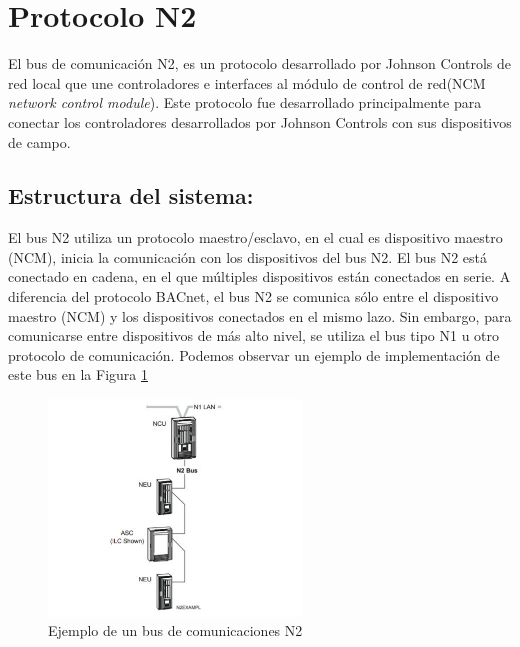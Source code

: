 \section{Protocolo N2}
El bus de comunicación N2, es un protocolo desarrollado por Johnson Controls de red local que une controladores e interfaces al módulo de control de red(NCM \textit{network control module}). Este protocolo fue desarrollado principalmente para conectar los controladores desarrollados por Johnson Controls con sus dispositivos de campo.

\subsection{Estructura del sistema:}
El bus N2 utiliza un protocolo maestro/esclavo, en el cual es dispositivo maestro (NCM), inicia la comunicación con los dispositivos del bus N2. El bus N2 está conectado en cadena, en el que múltiples dispositivos están conectados en serie. A diferencia del protocolo BACnet, el bus N2 se comunica sólo entre el dispositivo maestro (NCM) y los dispositivos conectados en el mismo lazo. Sin embargo, para comunicarse entre dispositivos de más alto nivel, se utiliza el bus tipo N1 u otro protocolo de comunicación. Podemos observar un ejemplo de implementación de este bus en la Figura \ref{fig:N2}

\begin{figure}[H]
    \centering
    \includegraphics[width=0.60\textwidth]{2_MainMatter/Capitulo1/Imagenes/N2_Johnson.JPG}
    \caption{Ejemplo de un bus de comunicaciones N2\cite{N2}}
    \label{fig:N2}
\end{figure}